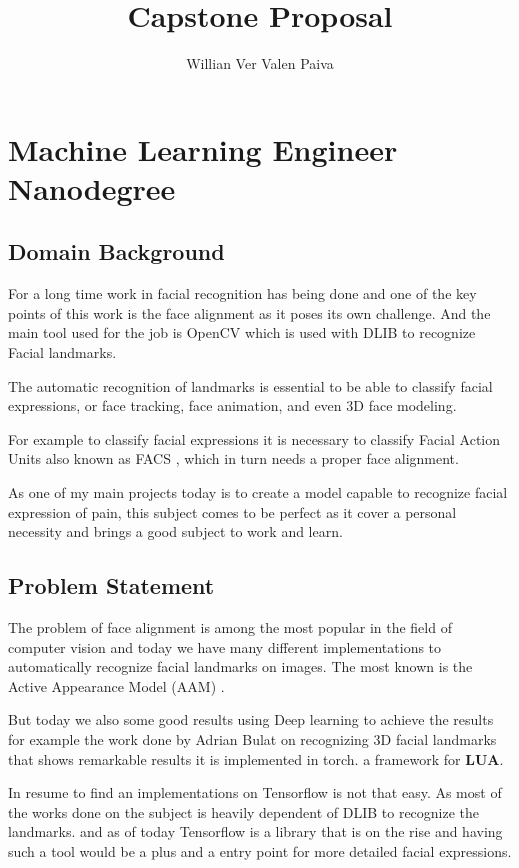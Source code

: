 \documentclass[11pt]{article}
\author{Willian Ver Valen Paiva}
\date{}
\title{Capstone Proposal}
\begin{document}
\maketitle

\section{Machine Learning Engineer Nanodegree}
\label{sec:org1223897}
\subsection{Domain Background}
\label{sec:org7c4259d}

For a long time work in facial recognition has being done and one of the key
points of this work is the face alignment as it poses its own challenge.
And the main tool used for the job is OpenCV which is used with DLIB to
recognize Facial landmarks.

The automatic recognition of landmarks is essential to be able to classify
facial expressions, or face tracking, face animation, and even 3D face
modeling.

For example to classify facial expressions it is necessary to classify
Facial Action Units also known as FACS \cite{ekman1977facial}, which in turn
needs a proper face alignment.

As one of my main projects today is to create a model capable to recognize
facial expression of pain, this subject comes to be perfect as it cover a
personal necessity and brings a good subject to work and learn.


\subsection{Problem Statement}
\label{sec:orgc813de3}
The problem of face alignment is among the most popular in the field of
computer vision and today we have many different implementations to
automatically recognize facial landmarks on images.
The most known is the Active Appearance Model (AAM)
\cite{edwards1998face,matthews2004active}.

But today we also some good results using Deep learning to achieve the
results for example the work done by Adrian Bulat on recognizing 3D facial
landmarks \cite{bulat2017far} that shows remarkable results it is implemented in torch.
a framework for \textbf{LUA}.

In resume to find an implementations on Tensorflow is not that easy. As most of the
works done on the subject is heavily dependent of DLIB to recognize the
landmarks. and as of today Tensorflow is a library that is on the rise and having such a
tool would be a plus and a entry point for more detailed facial expressions.
\end{document}
